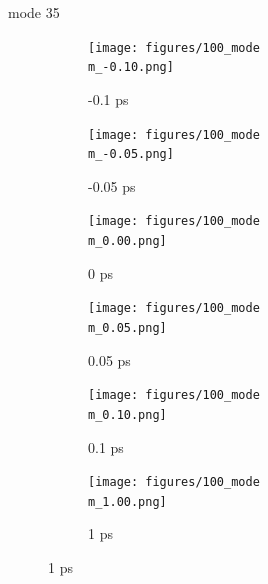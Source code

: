 \documentclass{beamer}
\newcommand\w{0.32}
\begin{document}
\renewcommand\m{35}
\begin{frame}{mode \m}
	\begin{figure}
		\centering
		\begin{subfigure}[b]{\w\textwidth}
			\centering
			\texttt{[image: figures/100\_mode\\m\_-0.10.png]}
			\caption{-0.1 ps}
		\end{subfigure}
		\begin{subfigure}[b]{\w\textwidth}
			\centering
			\texttt{[image: figures/100\_mode\\m\_-0.05.png]}
			\caption{-0.05 ps}
		\end{subfigure}
		\begin{subfigure}[b]{\w\textwidth}
			\centering
			\texttt{[image: figures/100\_mode\\m\_0.00.png]}
			\caption{0 ps}
		\end{subfigure}
		\begin{subfigure}[b]{\w\textwidth}
			\centering
			\texttt{[image: figures/100\_mode\\m\_0.05.png]}
			\caption{0.05 ps}
		\end{subfigure}
		\begin{subfigure}[b]{\w\textwidth}
			\centering
			\texttt{[image: figures/100\_mode\\m\_0.10.png]}
			\caption{0.1 ps}
		\end{subfigure}
		\begin{subfigure}[b]{\w\textwidth}
			\centering
			\texttt{[image: figures/100\_mode\\m\_1.00.png]}
			\caption{1 ps}
		\end{subfigure}
	\end{figure}
\end{frame}
\end{document}

